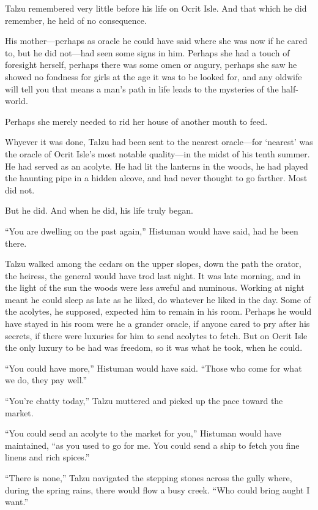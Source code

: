\secdiv

\noindent Talzu remembered very little before his life on Ocrit Isle. And that which he did remember, he held of no consequence.

His mother---perhaps as oracle he could have said where she was now if he cared to, but he did not---had seen some signs in him. Perhaps she had a touch of foresight herself, perhaps there was some omen or augury, perhaps she saw he showed no fondness for girls at the age it was to be looked for, and any oldwife will tell you that means a man's path in life leads to the mysteries of the half-world.

Perhaps she merely needed to rid her house of another mouth to feed.

Whyever it was done, Talzu had been sent to the nearest oracle---for `nearest' was the oracle of Ocrit Isle's most notable quality---in the midst of his tenth summer. He had served as an acolyte. He had lit the lanterns in the woods, he had played the haunting pipe in a hidden alcove, and had never thought to go farther. Most did not.

But he did. And when he did, his life truly began.

\secdiv

\noindent ``You are dwelling on the past again,'' Histuman would have said, had he been there.

Talzu walked among the cedars on the upper slopes, down the path the orator, the heiress, the general would have trod last night. It was late morning, and in the light of the sun the woods were less aweful and numinous. Working at night meant he could sleep as late as he liked, do whatever he liked in the day. Some of the acolytes, he supposed, expected him to remain in his room. Perhaps he would have stayed in his room were he a grander oracle, if anyone cared to pry after his secrets, if there were luxuries for him to send acolytes to fetch. But on Ocrit Isle the only luxury to be had was freedom, so it was what he took, when he could.

``You could have more,'' Histuman would have said. ``Those who come for what we do, they pay well.''

``You're chatty today,'' Talzu muttered and picked up the pace toward the market.

``You could send an acolyte to the market for you,'' Histuman would have maintained, ``as you used to go for me. You could send a ship to fetch you fine linens and rich spices.''

``There is none,'' Talzu navigated the stepping stones across the gully where, during the spring rains, there would flow a busy creek. ``Who could bring aught I want.''

